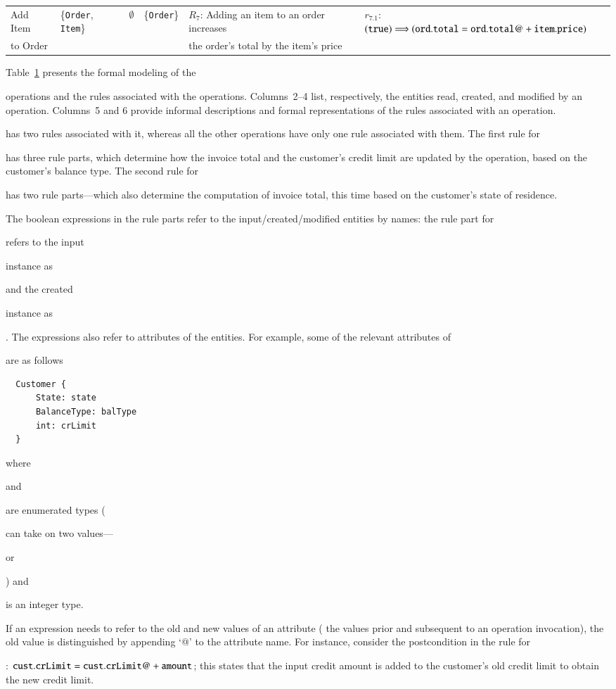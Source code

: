 \begin{table}[t]
{\begin{tabular}{|l|l|l|l|l|l|}
Add Item & \{{\tt Order}, {\tt Item}\} &
\multicolumn{1}{|c|}{$\emptyset$} & \{{\tt Order}\} &
$R_7$: Adding an item to an order increases &
$r_{7.1}$: $({\tt true}) \Longrightarrow ({\tt ord.total} = {\tt ord.total@} +
{\tt item.price})$ \\
to Order & & & & the order's total by the item's price & \\
\hline
\end{tabular}
}
\label{tab:bookstore-rules-spec}
\end{table}

Table~\ref{tab:bookstore-rules-spec} presents the formal modeling of the
\subject{jBilling} operations and the rules associated with the
operations. Columns~2--4 list, respectively, the entities read, created, and
modified by an operation. Columns~5 and 6 provide informal descriptions and
formal representations of the rules associated with an operation.
\subject{GenerateInvoice} has two rules associated with it, whereas all the
other operations have only one rule associated with them. The first rule for
\subject{GenerateInvoice} has three rule parts, which determine how the invoice
total and the customer's credit limit are updated by the operation, based on the
customer's balance type.  The second rule for \subject{GenerateInvoice} has two
rule parts---which also determine the computation of invoice total, this time
based on the customer's state of residence.

The boolean expressions in the rule parts refer to the input/crea\-ted/modified
entities by names: \eg the rule part for \subject{CreateOrder} refers to the
input \subject{Customer} instance as \subject{cust} and the created
\subject{Order} instance as \subject{ord}. The expressions also refer to
attributes of the entities. For example, some of the relevant attributes of
\subject{Customer} are as follows

\vspace*{-5pt}
{\small
\begin{verbatim}
  Customer {
      State: state
      BalanceType: balType
      int: crLimit
  }
\end{verbatim}
}
\vspace*{-5pt}

where \subject{State} and \subject{BalanceType} are
enumerated types (\eg \subject{BalanceType} can take on two values---\subject{None}
or \subject{Credit}) and \subject{crLimit} is an integer type.

If an expression needs to refer to the old and new values of an attribute (\ie
the values prior and subsequent to an operation invocation), the old value is
distinguished by appending `@' to the attribute name. For instance, consider the
postcondition in the rule for \subject{AddCreditLimit}: {\small ${\tt
    cust.crLimit} = {\tt cust.crLimit@} + {\tt amount}$}; this states that the
input credit amount is added to the customer's old credit limit to obtain the
new credit limit.
